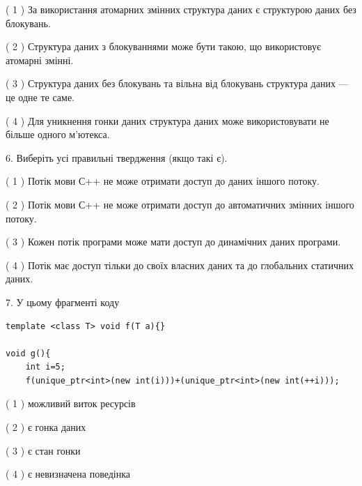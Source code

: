 \documentclass[12pt, ukrainian]{article}
\begin{document}
\begin {large}
{( 1 ) За використання атомарних змінних структура даних є структурою даних без блокувань.%

( 2 ) Структура даних з блокуваннями може бути такою, що використовує атомарні змінні.%

( 3 ) Структура даних без блокувань та вільна від блокувань структура даних --- це одне те саме.%

( 4 ) Для уникнення гонки даних структура даних може використовувати не більше одного м’ютекса.%
\newpage



\vspace{5mm}
6. Виберіть усі правильні твердження (якщо такі є).\par
\vspace{2mm}

( 1 ) Потік мови С++ не може отримати доступ до даних іншого потоку.%

( 2 ) Потік мови С++ не може отримати доступ до автоматичних змінних іншого потоку.%

( 3 ) Кожен потік програми може мати доступ до динамічних даних програми.%

( 4 ) Потік має доступ тільки до своїх власних даних та до глобальних статичних даних.%


\vspace{5mm}
7. У цьому фрагменті коду
\begin{verbatim}
template <class T> void f(T a){}

void g(){
    int i=5;
    f(unique_ptr<int>(new int(i)))+(unique_ptr<int>(new int(++i)));
\end{verbatim}
( 1 ) можливий виток ресурсів%

( 2 ) є гонка даних%

( 3 ) є стан гонки%

( 4 ) є невизначена поведінка%
}
\end {large}
\end{document}
